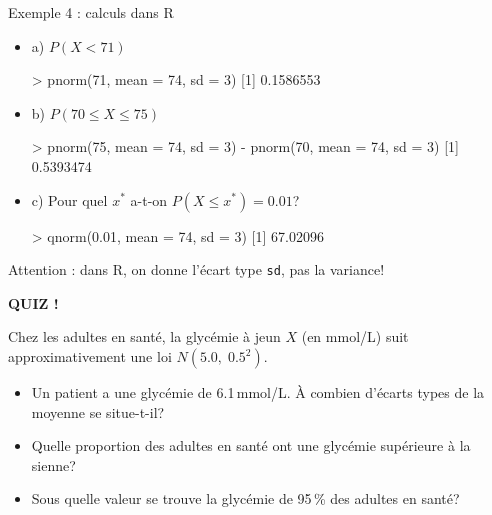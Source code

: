 \documentclass{BeamerTemplate}
\begin{document}
\begin{frame}[fragile,t]{Exemple 4 : calculs dans R}
  \begin{itemize}\itemsep 2mm
    \item a) $P(X < 71)$
\begin{console}
> pnorm(71, mean = 74, sd = 3)
[1] 0.1586553
\end{console}
    \item b) $P(70 \le X \le 75)$
\begin{console}
> pnorm(75, mean = 74, sd = 3) - pnorm(70, mean = 74, sd = 3)
[1] 0.5393474
\end{console}
    \item c) Pour quel $x^*$ a-t-on $P(X \le x^*) = 0.01$?
\begin{console}
> qnorm(0.01, mean = 74, sd = 3)
[1] 67.02096
\end{console}
  \end{itemize}
  {\small\color{gray} Attention : dans R, on donne l'écart type \texttt{sd}, pas la variance!}
\end{frame}

\begin{frame}[plain,t]
  \centerline{\LARGE\bfseries\alert{QUIZ !}}

  \medskip
  Chez les adultes en santé, la glycémie à jeun $X$ (en mmol/L) suit
  approximativement une loi $N(5.0,\; 0.5^2)$.
  \begin{itemize}\itemsep 1.1cm
    \item Un patient a une glycémie de 6.1\,mmol/L. À combien d'écarts types
      de la moyenne se situe-t-il?
    \item Quelle proportion des adultes en santé ont une glycémie
      supérieure à la sienne?
    \item Sous quelle valeur se trouve la glycémie de 95\,\% des adultes
      en santé?
  \end{itemize}
\end{frame}
\end{document}
